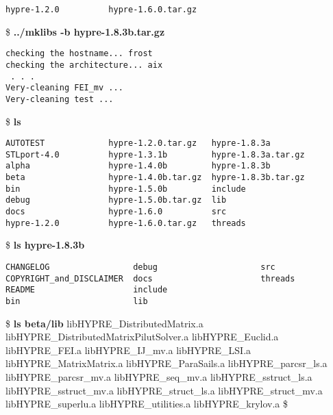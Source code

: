 \begin{ttfamily}
\begin{mdseries}
\begin{verbatim}
hypre-1.2.0          hypre-1.6.0.tar.gz
\end{verbatim}
\$ \textbf{../mklibs -b hypre-1.8.3b.tar.gz}\linebreak
\begin{verbatim}
checking the hostname... frost
checking the architecture... aix
 . . .
Very-cleaning FEI_mv ...
Very-cleaning test ...
\end{verbatim}
\$ \textbf{ls}\linebreak
\begin{verbatim}
AUTOTEST             hypre-1.2.0.tar.gz   hypre-1.8.3a
STLport-4.0          hypre-1.3.1b         hypre-1.8.3a.tar.gz
alpha                hypre-1.4.0b         hypre-1.8.3b
beta                 hypre-1.4.0b.tar.gz  hypre-1.8.3b.tar.gz
bin                  hypre-1.5.0b         include
debug                hypre-1.5.0b.tar.gz  lib
docs                 hypre-1.6.0          src
hypre-1.2.0          hypre-1.6.0.tar.gz   threads
\end{verbatim}
\$ \textbf{ls hypre-1.8.3b}\linebreak
\begin{verbatim}
CHANGELOG                 debug                     src
COPYRIGHT_and_DISCLAIMER  docs                      threads
README                    include
bin                       lib
\end{verbatim}
\$ \textbf{ls beta/lib}\linebreak
libHYPRE\_DistributedMatrix.a\linebreak
libHYPRE\_DistributedMatrixPilutSolver.a\linebreak
libHYPRE\_Euclid.a\linebreak
libHYPRE\_FEI.a\linebreak
libHYPRE\_IJ\_mv.a\linebreak
libHYPRE\_LSI.a\linebreak
libHYPRE\_MatrixMatrix.a\linebreak
libHYPRE\_ParaSails.a\linebreak
libHYPRE\_parcsr\_ls.a\linebreak
libHYPRE\_parcsr\_mv.a\linebreak
libHYPRE\_seq\_mv.a\linebreak
libHYPRE\_sstruct\_ls.a\linebreak
libHYPRE\_sstruct\_mv.a\linebreak
libHYPRE\_struct\_ls.a\linebreak
libHYPRE\_struct\_mv.a\linebreak
libHYPRE\_superlu.a\linebreak
libHYPRE\_utilities.a\linebreak
libHYPRE\_krylov.a\linebreak
\$ \linebreak
\end{mdseries}
\end{ttfamily}

